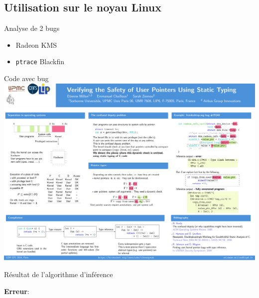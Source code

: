 \documentclass{beamer}
\def\codeout#1{
    \begin{center}
    \fboxsep=2mm
    \colorbox{codeoutcol}{\BUseVerbatim{#1}}
    \end{center}
}
\begin{document}
\subsection{Utilisation sur le noyau Linux}

\begin{frame}{Analyse de 2 bugs}

    \begin{itemize}
        \item Radeon KMS
        \item \texttt{ptrace} Blackfin
    \end{itemize}
\end{frame}

\begin{frame}{Code avec bug}
    \includegraphics[trim=2300 1430 100 500,clip,width=\textwidth]{poster.pdf}
\end{frame}

\begin{frame}[fragile]{Résultat de l'algorithme d'inférence}

\textbf{Erreur}:

\codeout{drmko}
\end{frame}
\end{document}
